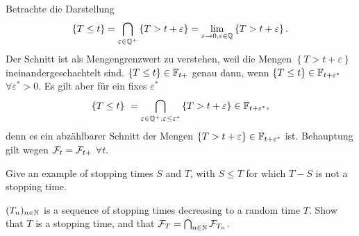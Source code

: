 \solution  Betrachte die Darstellung
\begin{eqnarray}
    \left\{ T \leq t \right\} = \bigcap_{\varepsilon\in\mathbb Q^{+}} \left\{ T > t+\varepsilon \right\}
    = \lim_{\varepsilon\to 0, \varepsilon\in\mathbb Q} \left\{ T > t+\varepsilon \right\}.
\end{eqnarray}
Der Schnitt ist als Mengengrenzwert zu verstehen, weil die Mengen $\left\{ T >
t+\varepsilon \right\}$ ineinandergeschachtelt sind. $\left\{ T \leq t \right\}\in \mathbb F_{t+}$
genau dann, wenn $\left\{ T \leq t \right\}\in \mathbb F_{t+\varepsilon^{*}}$ $\forall \varepsilon^{*}>0$.
Es gilt aber für ein fixes $\varepsilon^{*}$
\begin{equation}
    \left\{ T \leq t \right\}\ = 
    \bigcap_{\varepsilon\in\mathbb Q^{+}, \varepsilon\leq \varepsilon^{*}} \left\{ T > t+\varepsilon \right\} 
    \in\mathbb F_{t+\varepsilon^{*}},
\end{equation}
denn es ein abzählbarer Schnitt der Mengen $\left\{ T> t+\varepsilon
\right\}\in\mathbb F_{t+\varepsilon^{*}}$ ist. Behauptung gilt wegen $\mathcal F_t=\mathcal F_{t+}$ $\forall t$.

 Give an example of stopping times $S$
and $T$, with $S\leq T$ for which $T-S$ is not a stopping time. 

$(T_n)_{n\in\mathbb N}$ is a sequence of stopping times decreasing to a random time
$T$. Show that $T$ is a stopping time, and that $\mathcal F_{T} = \bigcap_{n\in\mathbb N}
\mathcal F_{T_n}$. 



